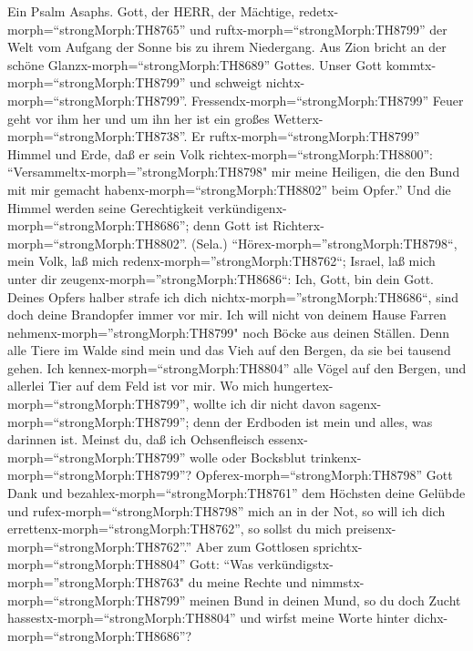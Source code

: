  Ein Psalm Asaphs. Gott, der HERR, der Mächtige,
redetx-morph=``strongMorph:TH8765'' und
ruftx-morph=``strongMorph:TH8799'' der Welt vom Aufgang der Sonne bis zu
ihrem Niedergang.  Aus Zion bricht an der schöne
Glanzx-morph=``strongMorph:TH8689'' Gottes.  Unser Gott
kommtx-morph=``strongMorph:TH8799'' und schweigt
nichtx-morph=``strongMorph:TH8799''.
Fressendx-morph=``strongMorph:TH8799'' Feuer geht vor ihm her und um ihn
her ist ein großes Wetterx-morph=``strongMorph:TH8738''.  Er
ruftx-morph=``strongMorph:TH8799'' Himmel und Erde, daß er sein Volk
richtex-morph=``strongMorph:TH8800'': 
``Versammeltx-morph=''strongMorph:TH8798" mir meine Heiligen, die den
Bund mit mir gemacht habenx-morph=``strongMorph:TH8802'' beim Opfer.''
 Und die Himmel werden seine Gerechtigkeit
verkündigenx-morph=``strongMorph:TH8686''; denn Gott ist
Richterx-morph=``strongMorph:TH8802''. (Sela.) 
``Hörex-morph=''strongMorph:TH8798``, mein Volk, laß mich
redenx-morph=''strongMorph:TH8762``; Israel, laß mich unter dir
zeugenx-morph=''strongMorph:TH8686``: Ich, Gott, bin dein Gott.
 Deines Opfers halber strafe ich dich
nichtx-morph=''strongMorph:TH8686``, sind doch deine Brandopfer immer
vor mir.  Ich will nicht von deinem Hause Farren
nehmenx-morph=''strongMorph:TH8799" noch Böcke aus deinen Ställen.
 Denn alle Tiere im Walde sind mein und das Vieh auf den
Bergen, da sie bei tausend gehen.  Ich
kennex-morph=``strongMorph:TH8804'' alle Vögel auf den Bergen, und
allerlei Tier auf dem Feld ist vor mir.  Wo mich
hungertex-morph=``strongMorph:TH8799'', wollte ich dir nicht davon
sagenx-morph=``strongMorph:TH8799''; denn der Erdboden ist mein und
alles, was darinnen ist.  Meinst du, daß ich Ochsenfleisch
essenx-morph=``strongMorph:TH8799'' wolle oder Bocksblut
trinkenx-morph=``strongMorph:TH8799''? 
Opferex-morph=``strongMorph:TH8798'' Gott Dank und
bezahlex-morph=``strongMorph:TH8761'' dem Höchsten deine Gelübde
 und rufex-morph=``strongMorph:TH8798'' mich an in der Not,
so will ich dich errettenx-morph=``strongMorph:TH8762'', so sollst du
mich preisenx-morph=``strongMorph:TH8762''.''  Aber zum
Gottlosen sprichtx-morph=``strongMorph:TH8804'' Gott: ``Was
verkündigstx-morph=''strongMorph:TH8763" du meine Rechte und
nimmstx-morph=``strongMorph:TH8799'' meinen Bund in deinen Mund,
 so du doch Zucht hassestx-morph=``strongMorph:TH8804'' und
wirfst meine Worte hinter dichx-morph=``strongMorph:TH8686''?
